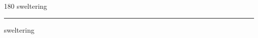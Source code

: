 
\begin{frame}
\begin{center}
\begin{turn}{180}
{\fontsize{2.5cm}{1em}\selectfont sweltering}
\end{turn}
\vspace{1em}\par  
\hrule
\vspace{1em}\par  
{\fontsize{2.5cm}{1em}\selectfont sweltering}
\end{center}
\end{frame}
